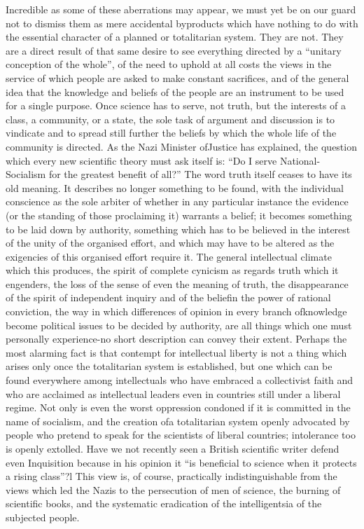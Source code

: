 \documentclass[11pt,openany]{book}
\begin{document}
Incredible as some of these aberrations may appear, we must yet be on our guard not to dismiss them as mere accidental byproducts which have nothing to do with the essential character of a planned or totalitarian system. They are not. They are a direct result of that same desire to see everything directed by a ``unitary conception of the whole'', of the need to uphold at all costs the views in the service of which people are asked to make constant sacrifices, and of the general idea that the knowledge and beliefs of the people are an instrument to be used for a single purpose. Once science has to serve, not truth, but the interests of a class, a community, or a state, the sole task of argument and discussion is to vindicate and to spread still further the beliefs by which the whole life of the community is directed. As the Nazi Minister ofJustice has explained, the question which every new scientific theory must ask itself is: ``Do I serve National-Socialism for the greatest benefit of all?'' The word truth itself ceases to have its old meaning. It describes no longer something to be found, with the individual conscience as the sole arbiter of whether in any particular instance the evidence (or the standing of those proclaiming it) warrants a belief; it becomes something to be laid down by authority, something which has to be believed in the interest of the unity of the organised effort, and which may have to be altered as the exigencies of this organised effort require it. The general intellectual climate which this produces, the spirit of complete cynicism as regards truth which it engenders, the loss of the sense of even the meaning of truth, the disappearance of the spirit of independent inquiry and of the beliefin the power of rational conviction, the way in which differences of opinion in every branch ofknowledge become political issues to be decided by authority, are all things which one must personally experience-no short description can convey their extent. Perhaps the most alarming fact is that contempt for intellectual liberty is not a thing which arises only once the totalitarian system is established, but one which can be found everywhere among intellectuals who have embraced a collectivist faith and who are acclaimed as intellectual leaders even in countries still under a liberal regime. Not only is even the worst oppression condoned if it is committed in the name of socialism, and the creation ofa totalitarian system openly advocated by people who pretend to speak for the scientists of liberal countries; intolerance too is openly extolled. Have we not recently seen a British scientific writer defend even Inquisition because in his opinion it ``is beneficial to science when it protects a rising class''?l This view is, of course, practically indistinguishable from the views which led the Nazis to the persecution of men of science, the burning of scientific books, and the systematic eradication of the intelligentsia of the subjected people.
\end{document}
